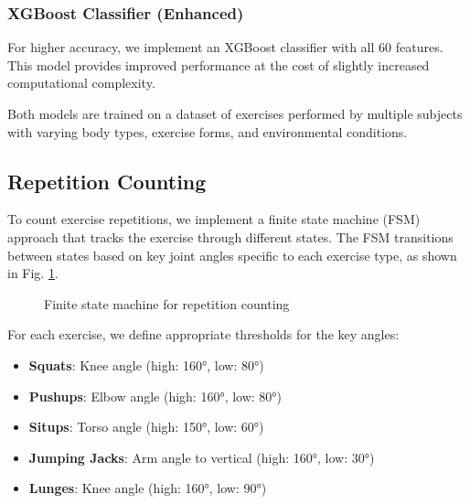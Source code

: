 \documentclass[conference]{IEEEtran}
\begin{document}
\subsubsection{XGBoost Classifier (Enhanced)}
For higher accuracy, we implement an XGBoost classifier with all 60 features. This model provides improved performance at the cost of slightly increased computational complexity.

Both models are trained on a dataset of exercises performed by multiple subjects with varying body types, exercise forms, and environmental conditions.

\subsection{Repetition Counting}
To count exercise repetitions, we implement a finite state machine (FSM) approach that tracks the exercise through different states. The FSM transitions between states based on key joint angles specific to each exercise type, as shown in Fig. \ref{fig:fsm}.

\begin{figure}[htbp]
\centering
{}
\caption{Finite state machine for repetition counting}
\label{fig:fsm}
\end{figure}

For each exercise, we define appropriate thresholds for the key angles:

\begin{itemize}
    \item \textbf{Squats}: Knee angle (high: 160°, low: 80°)
    \item \textbf{Pushups}: Elbow angle (high: 160°, low: 80°)
    \item \textbf{Situps}: Torso angle (high: 150°, low: 60°)
    \item \textbf{Jumping Jacks}: Arm angle to vertical (high: 160°, low: 30°)
    \item \textbf{Lunges}: Knee angle (high: 160°, low: 90°)
\end{itemize}
\end{document}
